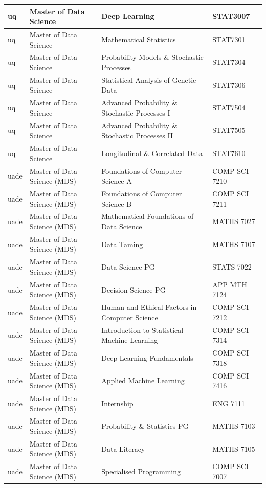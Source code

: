 \documentclass[
  letterpaper,
  DIV=11,
  numbers=noendperiod]{scrreport}
\begin{document}
\begin{table}
\begin{tabular}{l|l|l|l}
\hline
uq & Master of Data Science & Deep Learning & STAT3007\\
\hline
uq & Master of Data Science & Mathematical Statistics & STAT7301\\
\hline
uq & Master of Data Science & Probability Models \& Stochastic Processes & STAT7304\\
\hline
uq & Master of Data Science & Statistical Analysis of Genetic Data & STAT7306\\
\hline
uq & Master of Data Science & Advanced Probability \& Stochastic Processes I & STAT7504\\
\hline
uq & Master of Data Science & Advanced Probability \& Stochastic Processes II & STAT7505\\
\hline
uq & Master of Data Science & Longitudinal \& Correlated Data & STAT7610\\
\hline
uade & Master of Data Science (MDS) & Foundations of Computer Science A & COMP SCI 7210\\
\hline
uade & Master of Data Science (MDS) & Foundations of Computer Science B & COMP SCI 7211\\
\hline
uade & Master of Data Science (MDS) & Mathematical Foundations of Data Science & MATHS 7027\\
\hline
uade & Master of Data Science (MDS) & Data Taming & MATHS 7107\\
\hline
uade & Master of Data Science (MDS) & Data Science PG & STATS 7022\\
\hline
uade & Master of Data Science (MDS) & Decision Science PG & APP MTH 7124\\
\hline
uade & Master of Data Science (MDS) & Human and Ethical Factors in Computer Science & COMP SCI 7212\\
\hline
uade & Master of Data Science (MDS) & Introduction to Statistical Machine Learning & COMP SCI 7314\\
\hline
uade & Master of Data Science (MDS) & Deep Learning Fundamentals & COMP SCI 7318\\
\hline
uade & Master of Data Science (MDS) & Applied Machine Learning & COMP SCI 7416\\
\hline
uade & Master of Data Science (MDS) & Internship & ENG 7111\\
\hline
uade & Master of Data Science (MDS) & Probability \& Statistics PG & MATHS 7103\\
\hline
uade & Master of Data Science (MDS) & Data Literacy & MATHS 7105\\
\hline
uade & Master of Data Science (MDS) & Specialised Programming & COMP SCI 7007\\

\end{tabular}
\end{table}
\end{document}
